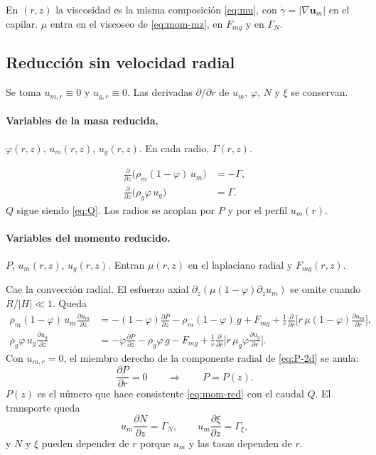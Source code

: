 \documentclass[11pt,a4paper]{article}
\newcommand{\p}{\partial}
\begin{document}
En $(r,z)$ la viscosidad es la misma composición \eqref{eq:mu}, con
$\dot\gamma=|\nabla\mathbf{u}_m|$ en el capilar. $\mu$ entra en el
viscoseo de \eqref{eq:mom-mz}, en $F_{mg}$ y en $\Gamma_N$.

\subsection{Reducción sin velocidad radial}
\label{sec:red}

Se toma $u_{m,r}\equiv 0$ y $u_{g,r}\equiv 0$. Las derivadas
$\p/\p r$ de $u_m$, $\varphi$, $N$ y $\xi$ se conservan.

\paragraph{Variables de la masa reducida.}
$\varphi(r,z)$, $u_m(r,z)$, $u_g(r,z)$. En cada radio, $\Gamma(r,z)$.

\begin{align}
\label{eq:masa-red}
\frac{\p}{\p z}\bigl(\rho_m(1-\varphi)\,u_m\bigr)
&=-\Gamma,
\\
\frac{\p}{\p z}\bigl(\rho_g\varphi\,u_g\bigr)
&=\Gamma.
\end{align}
$Q$ sigue siendo \eqref{eq:Q}. Los radios se acoplan por $P$ y por
el perfil $u_m(r)$.

\paragraph{Variables del momento reducido.}
$P$, $u_m(r,z)$, $u_g(r,z)$. Entran $\mu(r,z)$ en el laplaciano
radial y $F_{mg}(r,z)$.

Cae la convección radial. El esfuerzo axial
$\p_z(\mu(1-\varphi)\p_z u_m)$ se omite cuando
$R/|H|\ll 1$. Queda
\begin{align}
\label{eq:mom-red}
\rho_m(1-\varphi)\,u_m\frac{\p u_m}{\p z}
&=
-(1-\varphi)\frac{\p P}{\p z}
-\rho_m(1-\varphi)\,g
+F_{mg}
+\frac{1}{r}\frac{\p}{\p r}\Biggl[
r\,\mu(1-\varphi)\frac{\p u_m}{\p r}
\Biggr],
\\
\label{eq:mom-red-g}
\rho_g\varphi\,u_g\frac{\p u_g}{\p z}
&=
-\varphi\frac{\p P}{\p z}
-\rho_g\varphi\,g
-F_{mg}
+\frac{1}{r}\frac{\p}{\p r}\Biggl[
r\,\mu_g\varphi\frac{\p u_g}{\p r}
\Biggr].
\end{align}
Con $u_{m,r}=0$, el miembro derecho de la componente radial de
\eqref{eq:P-2d} se anula:
\begin{equation}
\label{eq:Pr}
\frac{\p P}{\p r}=0
\qquad\Rightarrow\qquad
P=P(z).
\end{equation}
$P(z)$ es el número que hace consistente \eqref{eq:mom-red} con el
caudal $Q$. El transporte queda
\begin{equation}
\label{eq:Nxi-red}
u_m\frac{\p N}{\p z}=\Gamma_N,
\qquad
u_m\frac{\p \xi}{\p z}=\Gamma_\xi,
\end{equation}
y $N$ y $\xi$ pueden depender de $r$ porque $u_m$ y las tasas
dependen de $r$.
\end{document}
